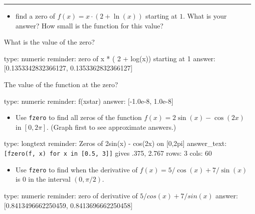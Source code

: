 \documentclass[12pt]{article}
\begin{document}
\begin{center}\rule{3in}{0.4pt}\end{center}

\begin{itemize}
\itemsep1pt\parskip0pt
\item
  find a zero of $f(x) = x\cdot (2+\ln(x))$ starting at $1$. What is
  your answer? How small is the function for this value?
\end{itemize}

What is the value of the zero?

\begin{answer}
    type: numeric
    reminder: zero of x * ( 2 + log(x)) starting at 1
    answer: [0.1353342832366127, 0.1353362832366127]

\end{answer}

The value of the function at the zero?

\begin{answer}
    type: numeric
    reminder: f(xstar)
    answer: [-1.0e-8, 1.0e-8]

\end{answer}

\begin{itemize}
\itemsep1pt\parskip0pt
\item
  Use \texttt{fzero} to find all zeros of the function
  $f(x) = 2\sin(x) -   \cos(2x)$ in $[0, 2\pi]$. (Graph first to see
  approximate answers.)
\end{itemize}

\begin{answer}
type: longtext
reminder: Zeros of 2sin(x) - cos(2x) on [0,2pi]
answer_text: \verb+[fzero(f, x) for x in [0.5, 3]]+ gives .375, 2.767 
rows: 3
cols: 60
\end{answer}

\begin{itemize}
\itemsep1pt\parskip0pt
\item
  Use \texttt{fzero} to find when the derivative of
  $f(x) = 5/\cos(x) +   7/\sin(x)$ is $0$ in the interval $(0, \pi/2)$.
\end{itemize}

\begin{answer}
    type: numeric
    reminder: zero of derivative of \( 5/cos(x) + 7/sin(x) \)
    answer: [0.8413496662250459, 0.8413696662250458]

\end{answer}
\end{document}
